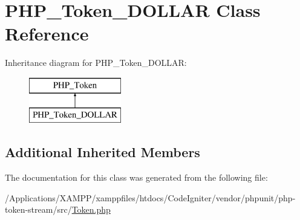 \hypertarget{class_p_h_p___token___d_o_l_l_a_r}{}\section{P\+H\+P\+\_\+\+Token\+\_\+\+D\+O\+L\+L\+AR Class Reference}
\label{class_p_h_p___token___d_o_l_l_a_r}
Inheritance diagram for P\+H\+P\+\_\+\+Token\+\_\+\+D\+O\+L\+L\+AR\+:\begin{figure}[H]
\begin{center}
\leavevmode
\includegraphics[height=2.000000cm]{class_p_h_p___token___d_o_l_l_a_r}
\end{center}
\end{figure}
\subsection*{Additional Inherited Members}


The documentation for this class was generated from the following file\+:\begin{DoxyCompactItemize}
\item 
/\+Applications/\+X\+A\+M\+P\+P/xamppfiles/htdocs/\+Code\+Igniter/vendor/phpunit/php-\/token-\/stream/src/\mbox{\hyperlink{_token_8php}{Token.\+php}}\end{DoxyCompactItemize}
